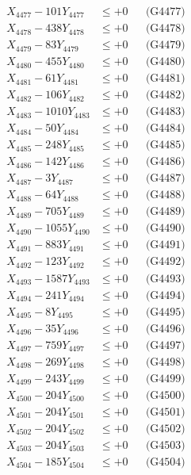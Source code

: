 \documentclass[a4paper,10pt]{article}
\begin{document}
{\begin{align}
X_{4477} - 101Y_{4477} &\leq +0 && \text{(G4477)} \\
X_{4478} - 438Y_{4478} &\leq +0 && \text{(G4478)} \\
X_{4479} - 83Y_{4479} &\leq +0 && \text{(G4479)} \\
X_{4480} - 455Y_{4480} &\leq +0 && \text{(G4480)} \\
\allowbreak
X_{4481} - 61Y_{4481} &\leq +0 && \text{(G4481)} \\
X_{4482} - 106Y_{4482} &\leq +0 && \text{(G4482)} \\
X_{4483} - 1010Y_{4483} &\leq +0 && \text{(G4483)} \\
X_{4484} - 50Y_{4484} &\leq +0 && \text{(G4484)} \\
X_{4485} - 248Y_{4485} &\leq +0 && \text{(G4485)} \\
X_{4486} - 142Y_{4486} &\leq +0 && \text{(G4486)} \\
X_{4487} - 3Y_{4487} &\leq +0 && \text{(G4487)} \\
X_{4488} - 64Y_{4488} &\leq +0 && \text{(G4488)} \\
X_{4489} - 705Y_{4489} &\leq +0 && \text{(G4489)} \\
X_{4490} - 1055Y_{4490} &\leq +0 && \text{(G4490)} \\
\allowbreak
X_{4491} - 883Y_{4491} &\leq +0 && \text{(G4491)} \\
X_{4492} - 123Y_{4492} &\leq +0 && \text{(G4492)} \\
X_{4493} - 1587Y_{4493} &\leq +0 && \text{(G4493)} \\
X_{4494} - 241Y_{4494} &\leq +0 && \text{(G4494)} \\
X_{4495} - 8Y_{4495} &\leq +0 && \text{(G4495)} \\
X_{4496} - 35Y_{4496} &\leq +0 && \text{(G4496)} \\
X_{4497} - 759Y_{4497} &\leq +0 && \text{(G4497)} \\
X_{4498} - 269Y_{4498} &\leq +0 && \text{(G4498)} \\
X_{4499} - 243Y_{4499} &\leq +0 && \text{(G4499)} \\
X_{4500} - 204Y_{4500} &\leq +0 && \text{(G4500)} \\
\allowbreak
X_{4501} - 204Y_{4501} &\leq +0 && \text{(G4501)} \\
X_{4502} - 204Y_{4502} &\leq +0 && \text{(G4502)} \\
X_{4503} - 204Y_{4503} &\leq +0 && \text{(G4503)} \\
X_{4504} - 185Y_{4504} &\leq +0 && \text{(G4504)} \\

\end{align}}
\end{document}
